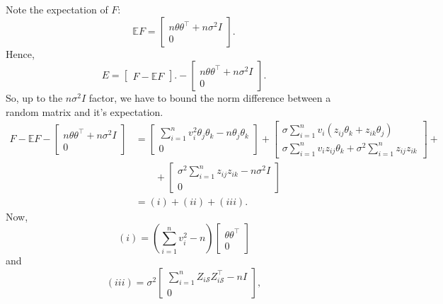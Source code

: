 \documentclass[11pt]{article}
\newcommand{\E}{\mathbb{E}}
\renewcommand{\S}{\mathcal{S}}
\begin{document}
Note the expectation of $F$:
\begin{equation}
\E F =
\begin{bmatrix}
n \theta\theta^{\top} + n\sigma^2 I \\
0
\end{bmatrix}.
\end{equation}
Hence, 
\begin{equation}
E = 
\begin{bmatrix}
F - \E F
\end{bmatrix}.
-
\begin{bmatrix}
n \theta\theta^{\top} + n\sigma^2 I \\
0
\end{bmatrix}.
\end{equation}
So, up to the $n\sigma^2I$ factor, we have to bound the norm difference between a random matrix and it's expectation.
\begin{align}
F - \E F -
 \begin{bmatrix}
n \theta\theta^{\top} + n\sigma^2 I \\
0
\end{bmatrix}
 & =
\begin{bmatrix}
\sum_{i=1}^nv_i^2\theta_j\theta_k  - n \theta_j\theta_k\\
0
\end{bmatrix}
+
\begin{bmatrix}
\sigma \sum_{i=1}^n v_i(z_{ij}\theta_k + z_{ik}\theta_j) \\
\sigma \sum_{i=1}^n v_iz_{ij}\theta_k + \sigma^2 \sum_{i=1}^n z_{ij}z_{ik}
\end{bmatrix}
+ \\
& \qquad + 
\begin{bmatrix}
 \sigma^2 \sum_{i=1}^n z_{ij}z_{ik} - n\sigma^2 I \\
0
\end{bmatrix} \\
& = (i) + (ii) + (iii).
\end{align}
Now,
\begin{equation}
(i) = 
(\sum_{i=1}^nv_i^2 -n)
\begin{bmatrix}
\theta\theta^{\top}\\
0
\end{bmatrix}
\end{equation}
and
\begin{equation}
(iii) = 
\sigma^2 
\begin{bmatrix}
\sum_{i=1}^n Z_{i\S}Z_{i\S}^{\top} - n I \\
0
\end{bmatrix},
\end{equation}
\end{document}
